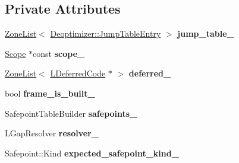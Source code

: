 \subsection*{Private Attributes}
\begin{DoxyCompactItemize}
\item 
\hyperlink{classv8_1_1internal_1_1_zone_list}{Zone\+List}$<$ \hyperlink{structv8_1_1internal_1_1_deoptimizer_1_1_jump_table_entry}{Deoptimizer\+::\+Jump\+Table\+Entry} $>$ {\bfseries jump\+\_\+table\+\_\+}\hypertarget{classv8_1_1internal_1_1_l_code_gen_ad2ef8a74a2afa30c51aaff6488e27fd8}{}\label{classv8_1_1internal_1_1_l_code_gen_ad2ef8a74a2afa30c51aaff6488e27fd8}

\item 
\hyperlink{classv8_1_1internal_1_1_scope}{Scope} $\ast$const {\bfseries scope\+\_\+}\hypertarget{classv8_1_1internal_1_1_l_code_gen_a0098892d08e683a136ad4c3c5c0312b9}{}\label{classv8_1_1internal_1_1_l_code_gen_a0098892d08e683a136ad4c3c5c0312b9}

\item 
\hyperlink{classv8_1_1internal_1_1_zone_list}{Zone\+List}$<$ \hyperlink{classv8_1_1internal_1_1_l_deferred_code}{L\+Deferred\+Code} $\ast$ $>$ {\bfseries deferred\+\_\+}\hypertarget{classv8_1_1internal_1_1_l_code_gen_a7139110abdd816400e6981971fa5fb18}{}\label{classv8_1_1internal_1_1_l_code_gen_a7139110abdd816400e6981971fa5fb18}

\item 
bool {\bfseries frame\+\_\+is\+\_\+built\+\_\+}\hypertarget{classv8_1_1internal_1_1_l_code_gen_addbffbb2cde95aaaf846dde5cc6f933f}{}\label{classv8_1_1internal_1_1_l_code_gen_addbffbb2cde95aaaf846dde5cc6f933f}

\item 
Safepoint\+Table\+Builder {\bfseries safepoints\+\_\+}\hypertarget{classv8_1_1internal_1_1_l_code_gen_a2f23671421f5e6b387907c13f3f9c5c9}{}\label{classv8_1_1internal_1_1_l_code_gen_a2f23671421f5e6b387907c13f3f9c5c9}

\item 
L\+Gap\+Resolver {\bfseries resolver\+\_\+}\hypertarget{classv8_1_1internal_1_1_l_code_gen_ab18a7f4ee0f3923ed261b96a781f73fe}{}\label{classv8_1_1internal_1_1_l_code_gen_ab18a7f4ee0f3923ed261b96a781f73fe}

\item 
Safepoint\+::\+Kind {\bfseries expected\+\_\+safepoint\+\_\+kind\+\_\+}\hypertarget{classv8_1_1internal_1_1_l_code_gen_a70a7d6376823e26f86421ae25c7c674d}{}\label{classv8_1_1internal_1_1_l_code_gen_a70a7d6376823e26f86421ae25c7c674d}


\end{DoxyCompactItemize}

